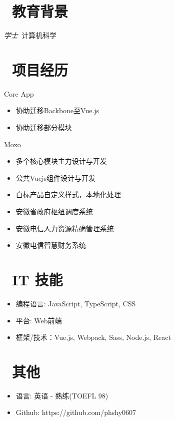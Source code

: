 \documentclass{resume}
\begin{document}


 
\section{\faGraduationCap\  教育背景}
\textit{学士}\ 计算机科学


\section{\faUsers\ 项目经历}

Core App
\begin{itemize}
  \item 协助迁移Backbone至Vue.js
  \item 协助迁移部分模块
\end{itemize}

Moxo
\begin{itemize}
  \item 多个核心模块主力设计与开发
  \item 公共Vuejs组件设计与开发
  \item 白标产品自定义样式，本地化处理
\end{itemize}

\begin{itemize}
  \item 安徽省政府枢纽调度系统
  \item 安徽电信人力资源精确管理系统
  \item 安徽电信智慧财务系统
\end{itemize}

\section{\faCogs\ IT 技能}
\begin{itemize}[parsep=0.5ex]
  \item 编程语言: JavaScript, TypeScript, CSS
  \item 平台: Web前端
  \item 框架/技术：Vue.js, Webpack, Sass, Node.js, React
\end{itemize}

\section{\faInfo\ 其他}
\begin{itemize}[parsep=0.5ex]
  \item 语言: 英语 - 熟练(TOEFL 98)
  \item Github: https://github.com/phshy0607
\end{itemize}
\end{document}
